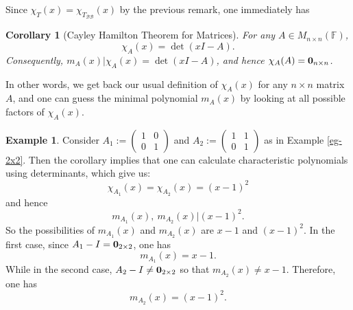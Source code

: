 \documentclass[11pt,openany]{book}
\theoremstyle{plain}
\newtheorem{corollary}[corollary]{Corollary}
\theoremstyle{definition}
\newtheorem{example}[example]{Example}
\theoremstyle{remark}
\begin{document}
Since $\chi_T(x) = \chi_{T_{\mathcal{B}\mathcal{B}}}(x)$ by the previous remark, one immediately has
\begin{corollary}[Cayley Hamilton Theorem for Matrices]
For any $A \in M_{n \times n}(\mathbb{F})$,
     $$\chi_{A}(x) = \det(xI -A).$$
Consequently, $m_A(x) | \chi_A(x) = \det(xI-A)$, and hence $\chi_A(A) = {\bf 0}_{n \times n}$.
\end{corollary}
In other words, we get back our usual definition of $\chi_A(x)$ for any $n \times n$ matrix $A$, and one can guess the minimal polynomial $m_A(x)$ by looking at all possible factors of $\chi_A(x)$.

\begin{example}
    Consider $A_1 := \begin{pmatrix} 1 & 0 \\ 0 & 1 \end{pmatrix}$ and $A_2 := \begin{pmatrix} 1 & 1 \\ 0 & 1 \end{pmatrix}$ as in Example \ref{eg-2x2}. Then the corollary implies that one can calculate characteristic polynomials using determinants, which give us:
    $$\chi_{A_1}(x) = \chi_{A_2}(x) = (x-1)^2$$
    and hence 
    $$m_{A_1}(x), \ m_{A_2}(x) | (x-1)^2.$$
    So the possibilities of $m_{A_1}(x)$ and $m_{A_2}(x)$ are $x-1$
    and $(x-1)^2$. 
    In the first case, since $A_1 - I = {\bf 0}_{2 \times 2}$, one has
    $$m_{A_1}(x) = x-1.$$
    While in the second case, $A_2 - I \neq {\bf 0}_{2 \times 2}$ so that $m_{A_2}(x) \neq x-1$. Therefore, one has
    $$m_{A_2}(x) = (x-1)^2.$$
\end{example}
\end{document}
